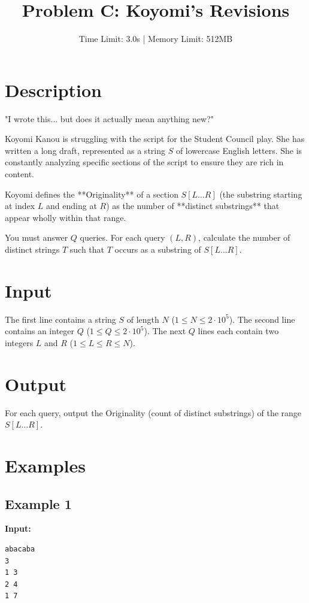 \documentclass[11pt, letterpaper]{article}
\title{\textbf{Problem C: Koyomi's Revisions}}
\author{Time Limit: 3.0s | Memory Limit: 512MB}
\date{}
\begin{document}
\maketitle

\section*{Description}

"I wrote this... but does it actually mean anything new?"

Koyomi Kanou is struggling with the script for the Student Council play. She has written a long draft, represented as a string $S$ of lowercase English letters. She is constantly analyzing specific sections of the script to ensure they are rich in content.

Koyomi defines the **Originality** of a section $S[L \dots R]$ (the substring starting at index $L$ and ending at $R$) as the number of **distinct substrings** that appear wholly within that range.

You must answer $Q$ queries. For each query $(L, R)$, calculate the number of distinct strings $T$ such that $T$ occurs as a substring of $S[L \dots R]$.

\section*{Input}

The first line contains a string $S$ of length $N$ ($1 \le N \le 2 \cdot 10^5$).
The second line contains an integer $Q$ ($1 \le Q \le 2 \cdot 10^5$).
The next $Q$ lines each contain two integers $L$ and $R$ ($1 \le L \le R \le N$).

\section*{Output}

For each query, output the Originality (count of distinct substrings) of the range $S[L \dots R]$.

\section*{Examples}

\subsection*{Example 1}
\textbf{Input:}
\begin{verbatim}
abacaba
3
1 3
2 4
1 7
\end{verbatim}
\end{document}

